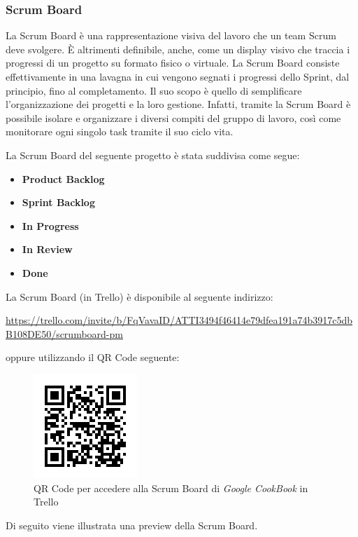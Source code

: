 \documentclass{article}
\begin{document}
\subsubsection{Scrum Board}
La Scrum Board è una rappresentazione visiva del lavoro che un team Scrum deve svolgere. 
È altrimenti definibile, anche, come un display visivo che traccia i progressi di un progetto su formato fisico o virtuale.
La Scrum Board consiste effettivamente in una lavagna in cui vengono segnati i progressi dello Sprint, dal principio, 
fino al completamento.
Il suo scopo è quello di semplificare l'organizzazione dei progetti e la loro gestione. 
Infatti, tramite la Scrum Board è possibile isolare e organizzare i diversi compiti del gruppo di lavoro, così come monitorare 
ogni singolo task tramite il suo ciclo vita. 

La Scrum Board del seguente progetto è stata suddivisa come segue:
\begin{itemize}
    \item \textbf{Product Backlog}
    \item \textbf{Sprint Backlog}
    \item \textbf{In Progress}
    \item \textbf{In Review}
    \item \textbf{Done}
\end{itemize}

La Scrum Board (in Trello) è disponibile al seguente indirizzo: 

\url{https://trello.com/invite/b/FqVavaID/ATTI3494f46414e79dfea191a74b3917c5dbB108DE50/scrumboard-pm}

oppure utilizzando il QR Code seguente:

\begin{figure}[h]
    \centering
    \includegraphics[scale=1]{./imgs/trello-board-qr-code.png}
    \caption{QR Code per accedere alla Scrum Board di \textit{Google CookBook} in Trello}
\end{figure}

\newpage
Di seguito viene illustrata una preview della Scrum Board.
\end{document}
